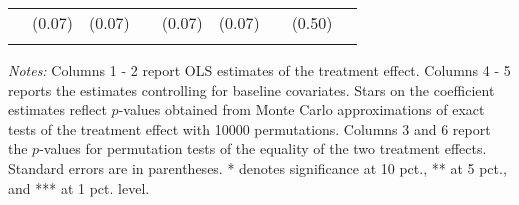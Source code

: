 \begin{table}[htbp]
{\begin{threeparttable}
\begin{tabular}{l*{8}{c}}
          &   (0.07)&   (0.07)&         &   (0.07)&   (0.07)&         &   (0.50)&         \\
          &         &         &         &         &         &         &         &         \\
\bottomrule \end{tabular} \begin{tablenotes}[flushleft] \footnotesize \item \emph{Notes:} Columns 1 - 2 report OLS estimates of the treatment effect. Columns 4 - 5 reports the estimates controlling for baseline covariates. Stars on the coefficient estimates reflect \(p\)-values obtained from Monte Carlo approximations of exact tests of the treatment effect with 10000 permutations. Columns 3 and 6 report the \(p\)-values for permutation tests of the equality of the two treatment effects. Standard errors are in parentheses. * denotes significance at 10 pct., ** at 5 pct., and *** at 1 pct. level. \end{tablenotes} \end{threeparttable} } \end{table}


